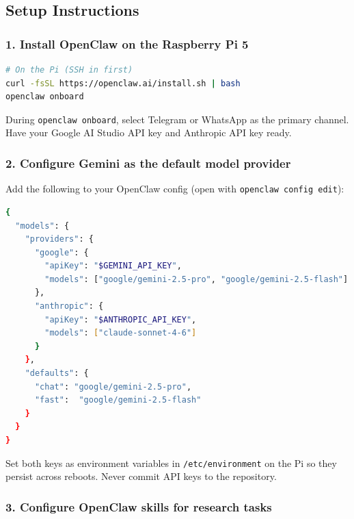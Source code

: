 \documentclass[11pt]{article}
\begin{document}
\subsection*{Setup Instructions}

\subsubsection*{1. Install OpenClaw on the Raspberry Pi 5}

\begin{lstlisting}[language=bash, basicstyle=\ttfamily\footnotesize,
    keywordstyle=\color{black}, frame=single, backgroundcolor=\color{lightgray}]
# On the Pi (SSH in first)
curl -fsSL https://openclaw.ai/install.sh | bash
openclaw onboard
\end{lstlisting}

During \texttt{openclaw onboard}, select Telegram or WhatsApp as the primary channel.
Have your Google AI Studio API key and Anthropic API key ready.

\subsubsection*{2. Configure Gemini as the default model provider}

Add the following to your OpenClaw config (open with \texttt{openclaw config edit}):

\begin{lstlisting}[language=bash, basicstyle=\ttfamily\footnotesize,
    keywordstyle=\color{black}, frame=single, backgroundcolor=\color{lightgray}]
{
  "models": {
    "providers": {
      "google": {
        "apiKey": "$GEMINI_API_KEY",
        "models": ["google/gemini-2.5-pro", "google/gemini-2.5-flash"]
      },
      "anthropic": {
        "apiKey": "$ANTHROPIC_API_KEY",
        "models": ["claude-sonnet-4-6"]
      }
    },
    "defaults": {
      "chat": "google/gemini-2.5-pro",
      "fast":  "google/gemini-2.5-flash"
    }
  }
}
\end{lstlisting}

Set both keys as environment variables in \texttt{/etc/environment} on the Pi so they
persist across reboots. Never commit API keys to the repository.

\subsubsection*{3. Configure OpenClaw skills for research tasks}
\end{document}
